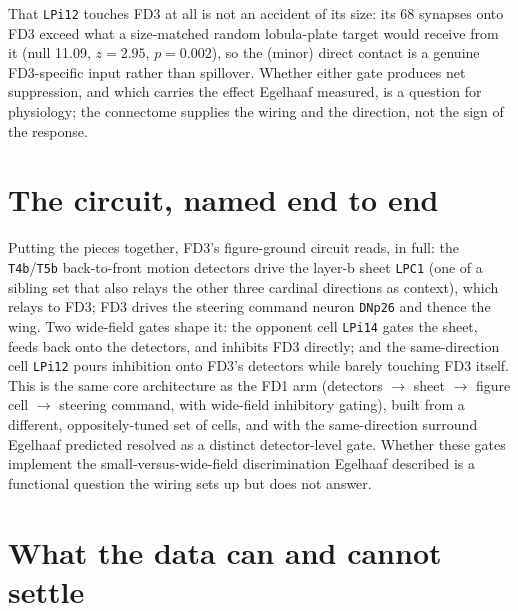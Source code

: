 \documentclass[11pt]{article}
\newcommand{\ttt}[1]{\texttt{#1}}
\begin{document}
That \ttt{LPi12} touches FD3 at all is not an accident of its size: its 68 synapses onto FD3 exceed what a size-matched random lobula-plate target would receive from it (null 11.09, $z=2.95$, $p=0.002$), so the (minor) direct contact is a genuine FD3-specific input rather than spillover. Whether either gate produces net suppression, and which carries the effect Egelhaaf measured, is a question for physiology; the connectome supplies the wiring and the direction, not the sign of the response.

\section{The circuit, named end to end}

Putting the pieces together, FD3's figure-ground circuit reads, in full: the \ttt{T4b}/\ttt{T5b} back-to-front motion detectors drive the layer-b sheet \ttt{LPC1} (one of a sibling set that also relays the other three cardinal directions as context), which relays to FD3; FD3 drives the steering command neuron \ttt{DNp26} and thence the wing. Two wide-field gates shape it: the opponent cell \ttt{LPi14} gates the sheet, feeds back onto the detectors, and inhibits FD3 directly; and the same-direction cell \ttt{LPi12} pours inhibition onto FD3's detectors while barely touching FD3 itself. This is the same core architecture as the FD1 arm (detectors $\rightarrow$ sheet $\rightarrow$ figure cell $\rightarrow$ steering command, with wide-field inhibitory gating), built from a different, oppositely-tuned set of cells, and with the same-direction surround Egelhaaf predicted resolved as a distinct detector-level gate. Whether these gates implement the small-versus-wide-field discrimination Egelhaaf described is a functional question the wiring sets up but does not answer.

\section{What the data can and cannot settle}
\end{document}

